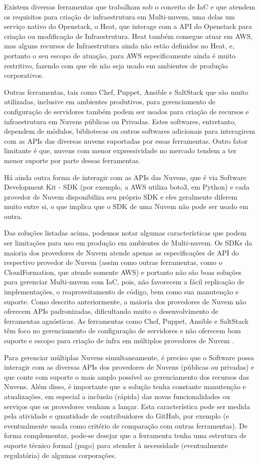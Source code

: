 \documentclass[12pt]{article}
\begin{document}
	Existem diversas ferramentas que trabalham sob o conceito de IaC e que atendem os requisitos para criação de infraestrutura em Multi-nuvem, uma delas um serviço nativo do Openstack, o Heat, que interage com a API do Openstack para criação ou modificação de Infraestrutura. Heat também consegue atuar em AWS, mas alguns recursos de Infraestrutura ainda não estão definidos no Heat, e, portanto o seu escopo de atuação, para AWS especificamente ainda é muito restritivo, fazendo com que ele não seja usado em ambientes de produção corporativos. 
	
	Outras ferramentas, tais como Chef, Puppet, Ansible e SaltStack que são muito utilizadas, inclusive em ambientes produtivos, para gerenciamento de configuração de servidores também podem ser usados para criação de recursos e infraestrutura em Nuvens públicas ou Privadas. Estes softwares, entretanto, dependem de módulos, bibliotecas ou outros softwares adicionais para interagirem com as APIs das diversas nuvens suportadas por essas ferramentas. Outro fator limitante é que, nuvens com menor expressividade no mercado tendem a ter menor suporte por parte dessas ferramentas.
	
	Há ainda outra forma de interagir com as APIs das Nuvens, que é via Software Development Kit - SDK (por exemplo, a AWS utiliza boto3, em Python) e cada provedor de Nuvem disponibiliza seu próprio SDK e eles geralmente diferem muito entre si, o que implica que o SDK de uma Nuvem não pode ser usado em outra.
	
	Das soluções listadas acima, podemos notar algumas características que podem ser limitações para uso em produção em ambientes de Multi-nuvem. Os SDKs da maioria dos provedores de Nuvem atende apenas as especificações de API do respectivo provedor de Nuvem (assim como outras ferramentas, como o CloudFormation, que atende somente AWS) e portanto não são boas soluções para gerenciar Multi-nuvem com IaC, pois, não favorecem a fácil replicação de implementações, o reaproveitamento de código, bem como sua manutenção e suporte. Como descrito anteriormente, a maioria dos provedores de Nuvem não oferecem APIs padronizadas, dificultando muito o desenvolvimento de ferramentas agnósticas. As ferramentas como Chef, Puppet, Ansible e SaltStack têm foco no gerenciamento de configuração de servidores e não oferecem bom suporte e escopo para criação de infra em múltiplos provedores de Nuvem \cite{Morris:2016}.
	
	Para gerenciar múltiplas Nuvens simultaneamente, é preciso que o Software possa interagir com as diversas APIs dos provedores de Nuvens (públicas ou privadas) e que conte com suporte o mais amplo possível ao gerenciamento dos recursos das Nuvens. Além disso, é importante que a solução tenha constante manutenção e atualizações, em especial a inclusão (rápida) das novas funcionalidades ou serviços que os provedores venham a lançar. Esta característica pode ser medida pela atividade e quantidade de contribuidores do GitHub, por exemplo (e eventualmente usada como critério de comparação com outras ferramentas). De forma complementar, pode-se desejar que a ferramenta tenha uma estrutura de suporte técnico formal (pago) para atender à necessidade (eventualmente regulatória) de algumas corporações.
	
\end{document}
